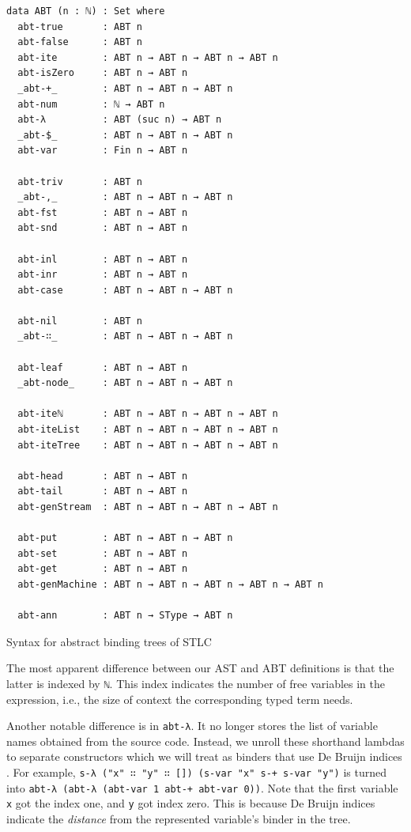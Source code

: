 \begin{listing}[H]
\begin{verbatim}
data ABT (n : ℕ) : Set where
  abt-true       : ABT n
  abt-false      : ABT n
  abt-ite        : ABT n → ABT n → ABT n → ABT n
  abt-isZero     : ABT n → ABT n
  _abt-+_        : ABT n → ABT n → ABT n
  abt-num        : ℕ → ABT n
  abt-λ          : ABT (suc n) → ABT n
  _abt-$_        : ABT n → ABT n → ABT n
  abt-var        : Fin n → ABT n

  abt-triv       : ABT n
  _abt-,_        : ABT n → ABT n → ABT n
  abt-fst        : ABT n → ABT n
  abt-snd        : ABT n → ABT n

  abt-inl        : ABT n → ABT n
  abt-inr        : ABT n → ABT n
  abt-case       : ABT n → ABT n → ABT n

  abt-nil        : ABT n
  _abt-∷_        : ABT n → ABT n → ABT n

  abt-leaf       : ABT n → ABT n
  _abt-node_     : ABT n → ABT n → ABT n

  abt-iteℕ       : ABT n → ABT n → ABT n → ABT n
  abt-iteList    : ABT n → ABT n → ABT n → ABT n
  abt-iteTree    : ABT n → ABT n → ABT n → ABT n

  abt-head       : ABT n → ABT n
  abt-tail       : ABT n → ABT n
  abt-genStream  : ABT n → ABT n → ABT n → ABT n

  abt-put        : ABT n → ABT n → ABT n
  abt-set        : ABT n → ABT n
  abt-get        : ABT n → ABT n
  abt-genMachine : ABT n → ABT n → ABT n → ABT n → ABT n

  abt-ann        : ABT n → SType → ABT n
\end{verbatim}
\caption{Syntax for abstract binding trees of STLC}
\label{code:abt-def}
\end{listing}

The most apparent difference between our AST and ABT definitions is that the latter is indexed by \verb$ℕ$. This index indicates the number of free variables in the expression, i.e., the size of context the corresponding typed term needs.

Another notable difference is in \verb$abt-λ$. It no longer stores the list of variable names obtained from the source code. Instead, we unroll these shorthand lambdas to separate constructors which we will treat as binders that use De Bruijn indices \cite{de1972lambda}. For example, \verb$s-λ ("x" ∷ "y" ∷ []) (s-var "x" s-+ s-var "y")$ is turned into \verb$abt-λ (abt-λ (abt-var 1 abt-+ abt-var 0))$. Note that the first variable \verb$x$ got the index one, and \verb$y$ got index zero. This is because De Bruijn indices indicate the \textit{distance} from the represented variable's binder in the tree.

